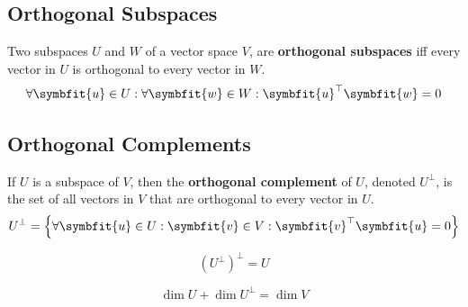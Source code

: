\documentclass{article}
\begin{document}
\subsection{Orthogonal Subspaces}
\begin{definition}
    Two subspaces \(U\) and \(W\) of a vector space \(V\), are
    \textbf{orthogonal subspaces} iff every vector in \(U\) is
    orthogonal to every vector in \(W\).
    \begin{equation*}
        \forall \symbfit{u}\in U:\forall \symbfit{w}\in W:\symbfit{u}^{\top}\symbfit{w}=0
    \end{equation*}
\end{definition}
\subsection{Orthogonal Complements}
\begin{definition}
    If \(U\) is a subspace of \(V\), then the
    \textbf{orthogonal complement} of \(U\), denoted \(U^{\perp}\), is
    the set of all vectors in \(V\) that are orthogonal to every vector
    in \(U\).
    \begin{equation*}
        U^{\perp} = \left\{ \forall \symbfit{u}\in U:\symbfit{v}\in V: \symbfit{v}^{\top}\symbfit{u}=0 \right\}
    \end{equation*}
\end{definition}
\begin{theorem}
    \begin{equation*}
        \left( U^{\perp} \right)^{\perp}=U
    \end{equation*}
\end{theorem}
\begin{theorem}
    \begin{equation*}
        \dim{U} + \dim{U^{\perp}} = \dim{V}
    \end{equation*}
\end{theorem}
\end{document}
